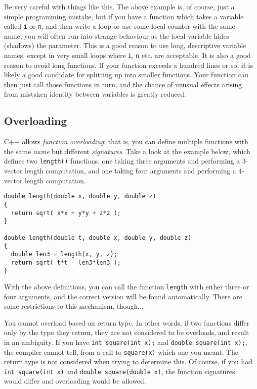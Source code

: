 \documentclass[a4paper]{scrartcl}
\begin{document}
Be very careful with things like this. The above example is, of course, just a simple programming mistake, but if you have a function which takes a variable called \verb|i| or \verb|n|, and then write a loop or use some local counter with the same name, you will often run into strange behaviour as the local variable hides (shadows) the parameter. This is a good reason to use long, descriptive variable names, except in very small loops where \verb|i|, \verb|n| etc. are acceptable. It is also a good reason to avoid long functions. If your function exceeds a hundred lines or so, it is likely a good candidate for splitting up into smaller functions. Your function can then just call those functions in turn, and the chance of unusual effects arising from mistaken identity between variables is greatly reduced.

\subsection{Overloading}
C++ allows \emph{function overloading}; that is, you can define multiple functions with the same \emph{name} but different \emph{signatures}. Take a look at the example below, which defines two \verb|length()| functions, one taking three arguments and performing a 3-vector length computation, and one taking four arguments and performing a 4-vector length computation.

\begin{verbatim}
double length(double x, double y, double z)
{
  return sqrt( x*x + y*y + z*z );
}

double length(double t, double x, double y, double z)
{
  double len3 = length(x, y, z);
  return sqrt( t*t - len3*len3 );
}
\end{verbatim}

With the above definitions, you can call the function \verb|length| with either three or four arguments, and the correct version will be found automatically. There are some restrictions to this mechanism, though...

You cannot overload based on return type. In other words, if two functions differ only by the type they return, they are not considered to be overloads, and result in an ambiguity. If you have \verb|int square(int x);| and \verb|double square(int x);|, the compiler cannot tell, from a call to \verb|square(x)| which one you meant. The return type is not considered when trying to determine this. Of course, if you had \verb|int square(int x)| and \verb|double square(double x)|, the function signatures would differ and overloading would be allowed.
\end{document}
